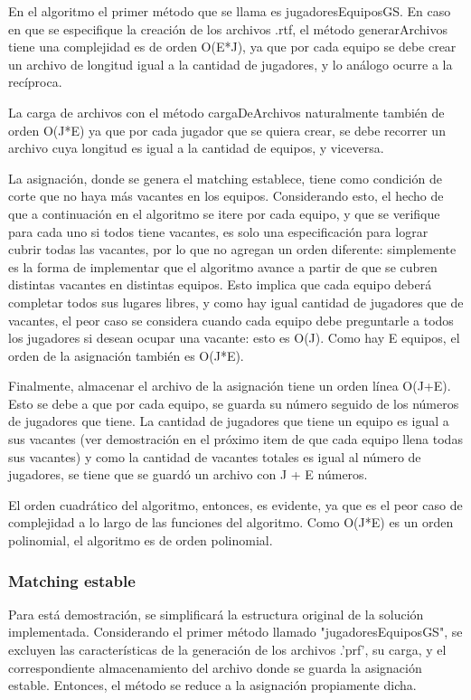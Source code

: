 \documentclass[titlepage,a4paper]{article}
\begin{document}
En el algoritmo el primer método que se llama es jugadoresEquiposGS. En caso en que se especifique la creación de los archivos .rtf, el método generarArchivos tiene una complejidad es de orden O(E*J), ya que por cada equipo se debe crear un archivo de longitud igual a la cantidad de jugadores, y lo análogo ocurre a la recíproca.

La carga de archivos con el método cargaDeArchivos naturalmente también de orden O(J*E) ya que por cada jugador que se quiera crear, se debe recorrer un archivo cuya longitud es igual a la cantidad de equipos, y viceversa.

La asignación, donde se genera el matching establece, tiene como condición de corte que no haya más vacantes en los equipos. Considerando esto, el hecho de que a continuación en el algoritmo se itere por cada equipo, y que se verifique para cada uno si todos tiene vacantes, es solo una especificación para lograr cubrir todas las vacantes, por lo que no agregan un orden diferente: simplemente es la forma de implementar que el algoritmo avance a partir de que se cubren distintas vacantes en distintas equipos. Esto implica que cada equipo deberá completar todos sus lugares libres, y como hay igual cantidad de jugadores que de vacantes, el peor caso se considera cuando cada equipo debe preguntarle a todos los jugadores si desean ocupar una vacante: esto es O(J). Como hay E equipos, el orden de la asignación también es O(J*E).

Finalmente, almacenar el archivo de la asignación tiene un orden línea O(J+E). Esto se debe a que por cada equipo, se guarda su número seguido de los números de jugadores que tiene. La cantidad de jugadores que tiene un equipo es igual a sus vacantes (ver demostración en el próximo item de que cada equipo llena todas sus vacantes) y como la cantidad de vacantes totales es igual al número de jugadores, se tiene que se guardó un archivo con J + E números.

El orden cuadrático del algoritmo, entonces, es evidente, ya que es el peor caso de complejidad a lo largo de las funciones del algoritmo. Como O(J*E) es un orden polinomial, el algoritmo es de orden polinomial.

\subsubsection{Matching estable}

Para está demostración, se simplificará la estructura original de la solución implementada. Considerando el primer método llamado "jugadoresEquiposGS", se excluyen las características de la generación de los archivos .'prf', su carga, y el correspondiente almacenamiento del archivo donde se guarda la asignación estable. Entonces, el método se reduce a la asignación propiamente dicha.
\end{document}

